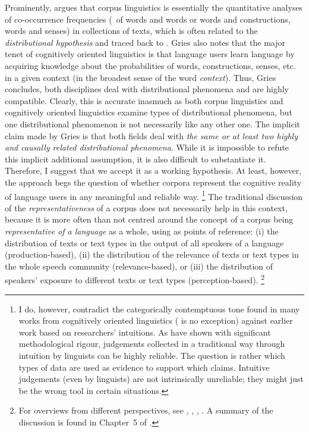 Prominently, \citet[591--592]{Gries2017b} argues that corpus linguistics is essentially the quantitative analyses of co-occurrence frequencies (\eeg\ of words and words or words and constructions, words and senses) in collections of texts, which is often related to the \textit{distributional hypothesis} and traced back to \citet{Harris1954}.
Gries also notes that the major tenet of cognitively oriented linguistics is that language users learn language by acquiring knowledge about the probabilities of words, constructions, senses, etc. in a given context (in the broadest sense of the word \textit{context}).
Thus, Gries concludes, both disciplines deal with distributional phenomena and are highly compatible.
Clearly, this is accurate inasmuch as both corpus linguistics and cognitively oriented linguistics examine types of distributional phenomena, but one distributional phenomenon is not necessarily like any other one.
The implicit claim made by Gries is that both fields deal with \textit{the same or at least two highly and causally related distributional phenomena}.
While it is impossible to refute this implicit additional assumption, it is also difficult to substantiate it.
Therefore, I suggest that we accept it as a working hypothesis.
At least, however, the approach begs the question of whether corpora represent the cognitive reality of language users in any meaningful and reliable way.%
\footnote{I do, however, contradict the categorically contemptuous tone found in many works from cognitively oriented linguistics (\citealt[590--593]{Gries2017b} is no exception) against earlier work based on researchers' intuitions.
As \citet{SprouseAlmeida2012,SprouseEa2013} have shown with significant methodological rigour, judgements collected in a traditional way through intuition by linguists can be highly reliable.
The question is rather which types of data are used as evidence to support which claims.
Intuitive judgements (even by linguists) are not intrinsically unreliable; they might just be the wrong tool in certain situations.}
The traditional discussion of the \textit{representativeness} of a corpus does not necessarily help in this context, because it is more often than not centred around the concept of a corpus being \textit{representative of a language} as a whole, using as points of reference:
(i) the distribution of texts or text types in the output of all speakers of a language (production-based),
(ii) the distribution of the relevance of texts or text types in the whole speech community (relevance-based), or
(iii) the distribution of speakers' exposure to different texts or text types (perception-based).%
\footnote{For overviews from different perspectives, see \citet{Biber1993}, \citet{MceneryEa2006}, \citet{Leech2007}, \citet{Hunston2008}.
A summary of the discussion is found in Chapter~5 of \citet{SchaeferBildhauer2013}.}

